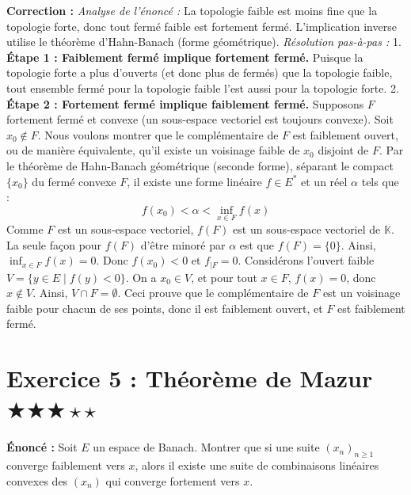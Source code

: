 \documentclass[11pt,a4paper]{article}
\begin{document}
\textbf{Correction :}
\textit{Analyse de l'énoncé :} La topologie faible est moins fine que la topologie forte, donc tout fermé faible est fortement fermé. L'implication inverse utilise le théorème d'Hahn-Banach (forme géométrique).
\textit{Résolution pas-à-pas :}
1. \textbf{Étape 1 : Faiblement fermé implique fortement fermé.}
   Puisque la topologie forte a plus d'ouverts (et donc plus de fermés) que la topologie faible, tout ensemble fermé pour la topologie faible l'est aussi pour la topologie forte.
2. \textbf{Étape 2 : Fortement fermé implique faiblement fermé.}
   Supposons $F$ fortement fermé et convexe (un sous-espace vectoriel est toujours convexe).
   Soit $x_0 \notin F$. Nous voulons montrer que le complémentaire de $F$ est faiblement ouvert, ou de manière équivalente, qu'il existe un voisinage faible de $x_0$ disjoint de $F$.
   Par le théorème de Hahn-Banach géométrique (seconde forme), séparant le compact $\{x_0\}$ du fermé convexe $F$, il existe une forme linéaire $f \in E^*$ et un réel $\alpha$ tels que :
   $$f(x_0) < \alpha < \inf_{x \in F} f(x)$$
   Comme $F$ est un sous-espace vectoriel, $f(F)$ est un sous-espace vectoriel de $\mathbb{K}$.
   La seule façon pour $f(F)$ d'être minoré par $\alpha$ est que $f(F) = \{0\}$.
   Ainsi, $\inf_{x \in F} f(x) = 0$. Donc $f(x_0) < 0$ et $f_{|F} = 0$.
   Considérons l'ouvert faible $V = \{ y \in E \mid f(y) < 0 \}$.
   On a $x_0 \in V$, et pour tout $x \in F$, $f(x) = 0$, donc $x \notin V$.
   Ainsi, $V \cap F = \emptyset$. Ceci prouve que le complémentaire de $F$ est un voisinage faible pour chacun de ses points, donc il est faiblement ouvert, et $F$ est faiblement fermé.


\section{Exercice 5 : Théorème de Mazur \quad $\bigstar\bigstar\bigstar\star\star$}

\textbf{Énoncé :}
Soit $E$ un espace de Banach. Montrer que si une suite $(x_n)_{n \ge 1}$ converge faiblement vers $x$, alors il existe une suite de combinaisons linéaires convexes des $(x_n)$ qui converge fortement vers $x$.
\end{document}
